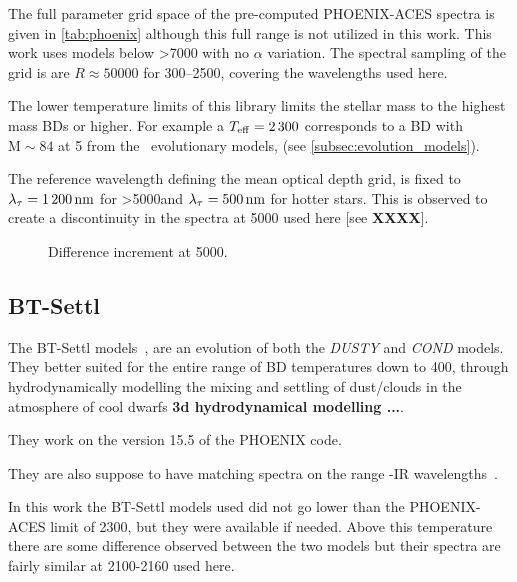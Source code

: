 The full parameter grid space of the pre-computed {PHOENIX-ACES} spectra is given in \cref{tab:phoenix} although this full range is not utilized in this work. This work uses models below >7000\K{} with no $\alpha$ variation. The spectral sampling of the grid is are $R \approx 50000$ for 300--2500\nm, covering the wavelengths used here.



The lower temperature limits of this library limits the stellar mass to the highest mass BDs or higher.
For example a \(T_{\mathrm{eff}}{}=2\,300\)\K{} corresponds to a {BD} with \(\textrm{M}\sim84\)\Mjup{} at 5\Gyr{} from the~\citet{baraffe_evolutionary_2003} evolutionary models, (see \cref{subsec:evolution_models}).


The reference wavelength defining the mean optical depth grid, is fixed to $\lambda_{\tau}=1\,200\,\si{\nano\meter}$ for \txteff{}>5000\K and $\lambda_{\tau}=500\,\si{\nano\meter}$ for hotter stars.
This is observed to create a discontinuity in the spectra at 5000\K{} used here [see \textbf{XXXX}].

\begin{figure}
    \caption{Difference increment at 5000\K{}.}
\end{figure}


\subsection{BT-Settl}
\label{subsec:btsettl}
The {BT-Settl} models~\citep{allard_btsettl_2013, baraffe_new_2015}, are an evolution of both the \emph{DUSTY} and \emph{COND} models. They better suited for the entire range of {BD} temperatures down to 400\K{}, through hydrodynamically modelling the mixing and settling of dust/clouds in the atmosphere of cool dwarfs \textbf{3d hydrodynamical modelling ...}.

They work on the version 15.5 of the PHOENIX code.

They are also suppose to have matching spectra on the range \nir{}-IR wavelengths~\citep{allard...}.

In this work the {BT-Settl} models used did not go lower than the PHOENIX-ACES limit of 2300\K{}, but they were available if needed. Above this temperature there are some difference observed between the two models but their spectra are fairly similar at 2100-2160\nm{} used here. 

